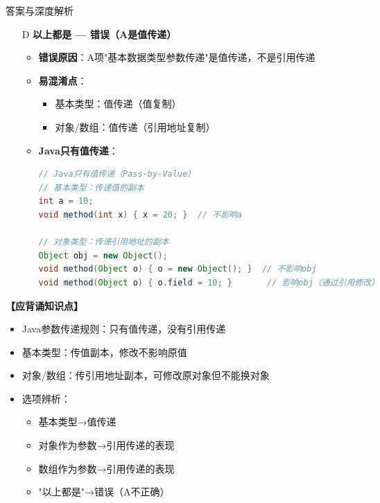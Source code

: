 \documentclass[12pt, a4paper]{ctexart}
\begin{document}
\begin{enumerate}[label=\textbf{\arabic*.}]
\begin{bluebox}{答案与深度解析}
\begin{itemize}[leftmargin=*, nosep, label={}]
			      \item[D] \textbf{以上都是 — 错误（A是值传递）}
			            \begin{itemize}[label={}, leftmargin=*, nosep]
				            \item \textbf{错误原因}：A项"基本数据类型参数传递"是值传递，不是引用传递
				            \item \textbf{易混淆点}：
				                  \begin{itemize}[label={}, nosep]
					                  \item 基本类型：值传递（值复制）
					                  \item 对象/数组：值传递（引用地址复制）
				                  \end{itemize}
				            \item \textbf{Java只有值传递}：
				                  \begin{lstlisting}[language=Java]
// Java只有值传递（Pass-by-Value）
// 基本类型：传递值的副本
int a = 10;
void method(int x) { x = 20; }  // 不影响a

// 对象类型：传递引用地址的副本
Object obj = new Object();
void method(Object o) { o = new Object(); }  // 不影响obj
void method(Object o) { o.field = 10; }       // 影响obj（通过引用修改）
				            \end{lstlisting}
			            \end{itemize}
		      \end{itemize}

		      \textbf{【应背诵知识点】}
		      \begin{itemize}[label={}, nosep]
			      \item Java参数传递规则：只有值传递，没有引用传递
			      \item 基本类型：传值副本，修改不影响原值
			      \item 对象/数组：传引用地址副本，可修改原对象但不能换对象
			      \item 选项辨析：
			            \begin{itemize}[label={}, nosep]
				            \item 基本类型→值传递
				            \item 对象作为参数→引用传递的表现
				            \item 数组作为参数→引用传递的表现
				            \item "以上都是"→错误（A不正确）
			            \end{itemize}
		      \end{itemize}


\end{bluebox}
\end{enumerate}
\end{document}
